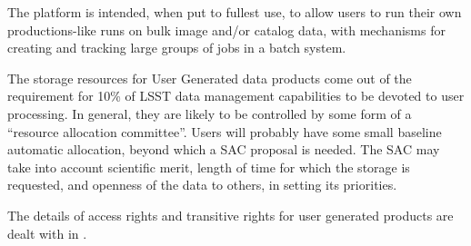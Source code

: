 The platform  is intended, when put to fullest use, to allow users to run their own productions-like runs on bulk image and/or catalog data, with mechanisms for creating and tracking large groups of jobs in a batch system.
%


The storage resources for User Generated data products come out of the \SRD requirement for 10\% of LSST data management capabilities to be devoted to user processing. In general, they are likely to be controlled by some form of a ``resource allocation committee''.  Users will probably have some small baseline automatic allocation, beyond which a SAC proposal is needed. The SAC may take into account scientific merit, length of time for which the storage is requested, and openness of the data to others, in setting its priorities.


The details of access rights and transitive rights for user generated products are dealt with in .








